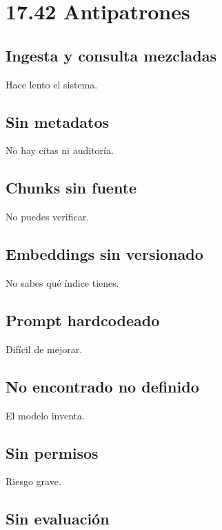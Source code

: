 \section{17.42 Antipatrones}\label{antipatrones-6}

\subsection{Ingesta y consulta
mezcladas}\label{ingesta-y-consulta-mezcladas}

Hace lento el sistema.

\subsection{Sin metadatos}\label{sin-metadatos}

No hay citas ni auditoría.

\subsection{Chunks sin fuente}\label{chunks-sin-fuente}

No puedes verificar.

\subsection{Embeddings sin versionado}\label{embeddings-sin-versionado}

No sabes qué índice tienes.

\subsection{Prompt hardcodeado}\label{prompt-hardcodeado}

Difícil de mejorar.

\subsection{No encontrado no definido}\label{no-encontrado-no-definido}

El modelo inventa.

\subsection{Sin permisos}\label{sin-permisos}

Riesgo grave.

\subsection{Sin evaluación}\label{sin-evaluaciuxf3n}

